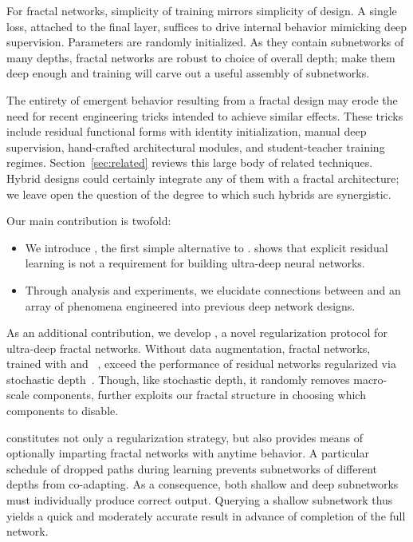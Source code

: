 For fractal networks, simplicity of training mirrors simplicity of design.
A single loss, attached to the final layer, suffices to drive internal
behavior mimicking deep supervision.  Parameters are randomly initialized.
As they contain subnetworks of many depths, fractal networks are robust to
choice of overall depth; make them deep enough and training will carve out a
useful assembly of subnetworks.

The entirety of emergent behavior resulting from a fractal design may erode
the need for recent engineering tricks intended to achieve similar effects.
These tricks include residual functional forms with identity initialization,
manual deep supervision, hand-crafted architectural modules, and
student-teacher training regimes.  Section~\ref{sec:related} reviews this
large body of related techniques.  Hybrid designs could certainly integrate
any of them with a fractal architecture; we leave open the question of the
degree to which such hybrids are synergistic.

Our main contribution is twofold:
\begin{itemize}
   \item{
      We introduce {\fracnet}, the first simple alternative to {\resnet}.
      {\Fracnet} shows that explicit residual learning is not a requirement
      for building ultra-deep neural networks.
   }
   \item{
      Through analysis and experiments, we elucidate connections between
      {\fracnet} and an array of phenomena engineered into previous deep
      network designs.
   }
\end{itemize}

As an additional contribution, we develop {\droppath}, a novel regularization
protocol for ultra-deep fractal networks.  Without data augmentation, fractal
networks, trained with {\droppath} and {\dropout}~\citep{dropout}, exceed the
performance of residual networks regularized via stochastic depth~\citep{
huang2016stochasticdepth}.  Though, like stochastic depth, it randomly removes
macro-scale components, {\droppath} further exploits our fractal structure
in choosing which components to disable.

{\Droppath} constitutes not only a regularization strategy, but also provides
means of optionally imparting fractal networks with anytime behavior.  A
particular schedule of dropped paths during learning prevents subnetworks of
different depths from co-adapting.  As a consequence, both shallow and deep
subnetworks must individually produce correct output.  Querying a shallow
subnetwork thus yields a quick and moderately accurate result in advance of
completion of the full network.


